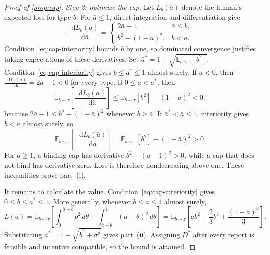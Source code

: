 \documentclass[12pt,reqno]{article}
\newcommand{\de}{\mathop{}\!\mathrm{d}}
\newcommand{\Ex}{\mathbb{E}}
\theoremstyle{definition} \newtheorem{example}{Example}
\theoremstyle{definition} \newtheorem{condition}{Condition}
\theoremstyle{definition} \newtheorem{corollary}{Corollary}
\theoremstyle{definition} \newtheorem{claim}{Claim}
\theoremstyle{definition} \newtheorem{definition}{Definition}
\theoremstyle{definition} \newtheorem{conjecture}{Conjecture}
\theoremstyle{definition} \newtheorem{Lemma}{Lemma}
\theoremstyle{definition} \newtheorem{lemma}{Lemma}
\theoremstyle{plain} \newtheorem{theorem}{Theorem}
\theoremstyle{definition} \newtheorem{assumption}{Assumption}
\theoremstyle{definition} \newtheorem*{assumptionnonumber}{Assumption}
\theoremstyle{definition} \newtheorem*{theoremNoNumber}{Proposition}
\theoremstyle{definition}\newtheorem{proposition}{Proposition}
\theoremstyle{definition} \newtheorem{observation}{Observation}
\theoremstyle{definition} \newtheorem*{definitionNoNumber}{Definition}
\theoremstyle{definition} \newtheorem{Definition}{Definition}
\theoremstyle{definition} \newtheorem*{DefinitionNoNumber}{Definition}
\theoremstyle{definition} \newtheorem*{fact}{Fact}
\theoremstyle{definition} \newtheorem*{property}{Property}
\theoremstyle{definition} \newtheorem{remark}{Remark}
\theoremstyle{definition}\newtheorem{romanexampleinner}{Example}
\begin{document}
\begin{proof}[Proof of \cref{prop:cap}]
\emph{Step 2: optimize the cap.} Let $L_b(\bar a)$ denote the human's expected loss for type $b$. For $\bar a\leq1$, direct integration and differentiation give
\[
\frac{\de L_b(\bar a)}{\de \bar a}=
\begin{cases}
2\bar a-1,&\bar a\leq b,\\
b^2-(1-\bar a)^2,&b<\bar a.
\end{cases}
\]
Condition~\eqref{eq:cap-interiority} bounds $b$ by one, so dominated convergence justifies taking expectations of these derivatives.
Set $\bar a^*=1-\sqrt{\Ex_{b\sim\tau}[b^2]}$. Condition~\eqref{eq:cap-interiority} gives $b\leq\bar a^*\leq1$ almost surely. If $\bar a<0$, then $\frac{\de L_b(\bar a)}{\de \bar a}=2\bar a-1<0$ for every type. If $0\leq\bar a<\bar a^*$, then
\[
\Ex_{b\sim\tau}\left[\frac{\de L_b(\bar a)}{\de \bar a}\right]
\leq
\Ex_{b\sim\tau}[b^2]-(1-\bar a)^2<0,
\]
because $2\bar a-1\leq b^2-(1-\bar a)^2$ whenever $b\geq\bar a$. If $\bar a^*<\bar a\leq1$, interiority gives $b<\bar a$ almost surely, so
\[
\Ex_{b\sim\tau}\left[\frac{\de L_b(\bar a)}{\de \bar a}\right]
=\Ex_{b\sim\tau}[b^2]-(1-\bar a)^2>0.
\]
For $\bar a\geq1$, a binding cap has derivative $b^2-(\bar a-1)^2>0$, while a cap that does not bind has derivative zero. Loss is therefore nondecreasing above one. These inequalities prove part~(i).

It remains to calculate the value. Condition~\eqref{eq:cap-interiority} gives $0\leq b\leq\bar a^*\leq1$. More generally, whenever $b\leq\bar a\leq1$ almost surely,
\[
L(\bar a)
=\Ex_{b\sim\tau}\!\left[
\int_0^{\bar a-b}b^2\,d\theta
+\int_{\bar a-b}^1(\bar a-\theta)^2\,d\theta
\right]
=\Ex_{b\sim\tau}\!\left[
\bar a b^2-\frac{2}{3}b^3+\frac{(1-\bar a)^3}{3}
\right].
\]
Substituting $\bar a^*=1-\sqrt{\bar b^2+\sigma^2}$ gives part~(ii). Assigning $D^*$ after every report is feasible and incentive compatible, so the bound is attained.
\end{proof}
\end{document}
